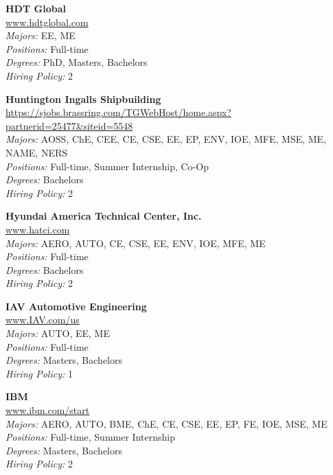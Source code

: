 \documentclass[twoside]{article}
\begin{document}
\begin{center}
\begin{multicols}{3}
\begin{minipage}{.9\columnwidth}{\Large\bf HDT Global }\\
	\url{www.hdtglobal.com}\\
	\emph{Majors:} EE, ME\\
	\emph{Positions:} Full-time\\
	\emph{Degrees:} PhD, Masters, Bachelors\\
	\emph{Hiring Policy:} 2\\
\end{minipage}
 
\begin{minipage}{.9\columnwidth}{\Large\bf Huntington Ingalls Shipbuilding }\\
	\url{https://sjobs.brassring.com/TGWebHost/home.aspx?partnerid=25477&siteid=5548}\\
	\emph{Majors:} AOSS, ChE, CEE, CE, CSE, EE, EP, ENV, IOE, MFE, MSE, ME, NAME, NERS\\
	\emph{Positions:} Full-time, Summer Internship, Co-Op\\
	\emph{Degrees:} Bachelors\\
	\emph{Hiring Policy:} 2\\
\end{minipage}
 
\begin{minipage}{.9\columnwidth}{\Large\bf Hyundai America Technical Center, Inc. }\\
	\url{www.hatci.com}\\
	\emph{Majors:} AERO, AUTO, CE, CSE, EE, ENV, IOE, MFE, ME\\
	\emph{Positions:} Full-time\\
	\emph{Degrees:} Bachelors\\
	\emph{Hiring Policy:} 2\\
\end{minipage}
 
\begin{minipage}{.9\columnwidth}{\Large\bf IAV Automotive Engineering }\\
	\url{www.IAV.com/us}\\
	\emph{Majors:} AUTO, EE, ME\\
	\emph{Positions:} Full-time\\
	\emph{Degrees:} Masters, Bachelors\\
	\emph{Hiring Policy:} 1\\
\end{minipage}
 
\begin{minipage}{.9\columnwidth}{\Large\bf IBM }\\
	\url{www.ibm.com/start}\\
	\emph{Majors:} AERO, AUTO, BME, ChE, CE, CSE, EE, EP, FE, IOE, MSE, ME\\
	\emph{Positions:} Full-time, Summer Internship\\
	\emph{Degrees:} Masters, Bachelors\\
	\emph{Hiring Policy:} 2\\
\end{minipage}
 

\end{multicols}
\end{center}
\end{document}
